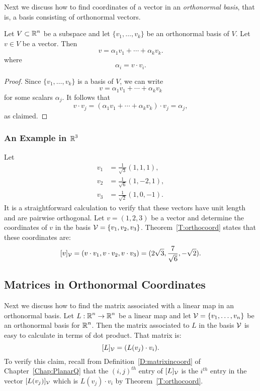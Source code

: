 \documentclass{ximera}
\begin{document}
Next we discuss how to find coordinates of a vector in an
{\em orthonormal basis},
that is, a basis consisting of orthonormal vectors.

\begin{theorem}  \label{T:orthocoord}
Let $V\subset\mbox{$\Bbb{R}$}^n$ be a subspace and
let $\{v_1,\ldots,v_k\}$ be an
orthonormal basis of $V$.  Let $v\in V$ be a vector.   Then
\[
v = \alpha_1v_1 + \cdots + \alpha_kv_k.
\]
where
\[
\alpha_i = v\cdot v_i.
\]
\end{theorem}

\begin{proof}  Since $\{v_1,\ldots,v_k\}$ is a basis of $V$, we can write
\[
v = \alpha_1v_1 + \cdots + \alpha_kv_k
\]
for some scalars $\alpha_j$.  It follows that
\[
v\cdot v_j = (\alpha_1v_1 + \cdots + \alpha_kv_k)\cdot v_j = \alpha_j,
\]
as claimed.   \end{proof}

\subsubsection{An Example in $\mbox{$\Bbb{R}$}^3$}

Let
\begin{align*}
  v_1 &= \frac{1}{\sqrt{3}}(1,1,1), \\
  v_2 &= \frac{1}{\sqrt{6}}(1,-2,1), \\
  v_3 &= \frac{1}{\sqrt{2}}(1,0,-1).
\end{align*}
It is a straightforward calculation to verify that these vectors have
unit length and are pairwise orthogonal.  Let $v=(1,2,3)$ be a vector
and determine the coordinates of $v$ in the basis ${\cal V}=\{v_1,v_2,v_3\}$.
Theorem~\ref{T:orthocoord} states that these coordinates are:
\[
[v]_{\cal V} = (v\cdot v_1, v\cdot v_2, v\cdot v_3)
= (2\sqrt{3},\frac{7}{\sqrt{6}},-\sqrt{2}).
\]


\subsection*{Matrices in Orthonormal Coordinates}

Next we discuss how to find the matrix associated with a linear map in an
orthonormal basis.  Let $L:\mbox{$\Bbb{R}$}^n\to\mbox{$\Bbb{R}$}^n$ be a linear map and let
${\cal V} = \{v_1,\ldots,v_n\}$ be an orthonormal basis for $\mbox{$\Bbb{R}$}^n$.  Then
the matrix associated to $L$ in the basis ${\cal V}$ is easy to calculate
in terms of dot product.  That matrix is:
\begin{equation}  \label{e:coordorthomat}
[L]_{\cal V} = (L(v_j)\cdot v_i).
\end{equation}
To verify this claim, recall from Definition~\ref{D:matrixincoord} of
Chapter~\ref{Chap:PlanarQ} that the $(i,j)^{th}$ entry of $[L]_{\cal V}$ is
the $i^{th}$ entry in the vector $[L(v_j)]_{\cal V}$ which is
$L(v_j)\cdot v_i$ by Theorem~\ref{T:orthocoord}.
\end{document}
